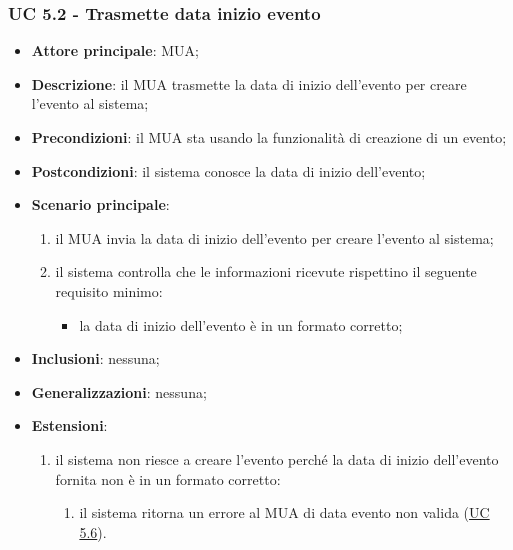     \subsubsection{UC 5.2 - Trasmette data inizio evento} \label{sec:UC5.2}
    \begin{itemize}
        \item \textbf{Attore principale}: MUA;
        \item \textbf{Descrizione}: il MUA trasmette la data di inizio dell'evento per creare l'evento al sistema;
        \item \textbf{Precondizioni}: il MUA sta usando la funzionalità di creazione di un evento;
        \item \textbf{Postcondizioni}: il sistema conosce la data di inizio dell'evento;
        \item \textbf{Scenario principale}:
            \begin{enumerate}
                \item il MUA invia la data di inizio dell'evento per creare l'evento al sistema;
                \item il sistema controlla che le informazioni ricevute rispettino il seguente requisito minimo:
                    \begin{itemize}
                        \item la data di inizio dell'evento è in un formato corretto;
                    \end{itemize}
            \end{enumerate}
        \item \textbf{Inclusioni}: nessuna;
        \item \textbf{Generalizzazioni}: nessuna;
        \item \textbf{Estensioni}:
            \begin{enumerate}[label=\alph*.]
                \item il sistema non riesce a creare l'evento perché la data di inizio dell'evento fornita non è in un formato corretto:
                \begin{enumerate}[label=\arabic*.]
                    \item il sistema ritorna un errore al MUA di data evento non valida (\hyperref[sec:UC5.6]{UC 5.6}).
                \end{enumerate}
            \end{enumerate}
    \end{itemize}


